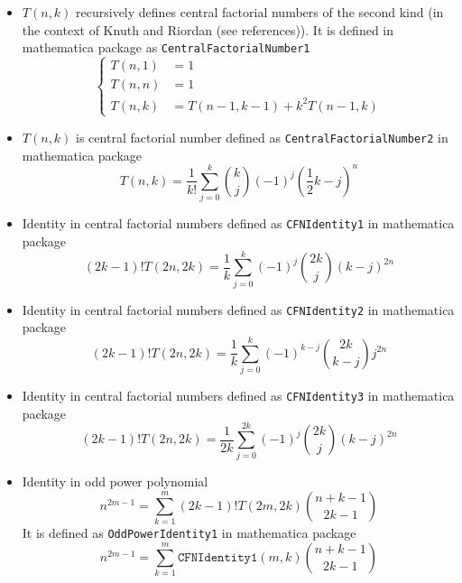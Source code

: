 \begin{itemize}
    \item $T(n,k)$ recursively defines central factorial numbers of the second kind
    (in the context of Knuth and Riordan (see references)).
    It is defined in mathematica package as \texttt{CentralFactorialNumber1}
    \begin{equation*}
        \begin{cases}
            T(n,1) &= 1 \\
            T(n,n) &= 1 \\
            T(n,k) &= T(n-1, k-1) + k^2 T(n-1, k)
        \end{cases}
    \end{equation*}
    \item $T(n,k)$ is central factorial number defined as \texttt{CentralFactorialNumber2} in mathematica package
    \begin{equation*}
        T(n,k) = \frac{1}{k!} \sum_{j=0}^{k} \binom{k}{j} (-1)^{j} \left( \frac{1}{2}k - j \right)^{n}
    \end{equation*}
    \item Identity in central factorial numbers defined as \texttt{CFNIdentity1} in mathematica package
    \begin{equation*}
    (2k-1)! T(2n,2k) = \frac{1}{k} \sum_{j=0}^{k} (-1)^j \binom{2k}{j} (k-j)^{2n}
    \end{equation*}
    \item Identity in central factorial numbers defined as \texttt{CFNIdentity2} in mathematica package
    \begin{equation*}
    (2k-1)! T(2n,2k) = \frac{1}{k} \sum_{j=0}^{k} (-1)^{k-j} \binom{2k}{k-j} j^{2n}
    \end{equation*}
    \item Identity in central factorial numbers defined as \texttt{CFNIdentity3} in mathematica package
    \begin{equation*}
    (2k-1)! T(2n, 2k) = \frac{1}{2k} \sum_{j=0}^{2k} (-1)^{j} \binom{2k}{j} (k-j)^{2n}
    \end{equation*}
    \item Identity in odd power polynomial
    \begin{equation*}
        n^{2m-1} = \sum_{k=1}^{m} (2k-1)! T(2m,2k) \binom{n+k-1}{2k-1}
    \end{equation*}
    It is defined as \texttt{OddPowerIdentity1} in mathematica package
    \begin{equation*}
        n^{2m-1} = \sum_{k=1}^{m} \mathtt{CFNIdentity1} (m,k) \binom{n+k-1}{2k-1}

\end{equation*}
\end{itemize}
